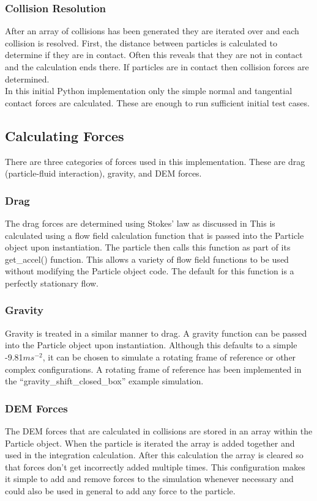\documentclass[10pt,a4paper,titlepage]{report}
\begin{document}
\subsubsection{Collision Resolution}
After an array of collisions has been generated they are iterated over and each collision is resolved. First, the distance between particles is calculated to determine if they are in contact. Often this reveals that they are not in contact and the calculation ends there. If particles are in contact then collision forces are determined.
\\In this initial Python implementation only the simple normal and tangential contact forces are calculated. These are enough to run sufficient initial test cases.
\subsection{Calculating Forces}
There are three categories of forces used in this implementation. These are drag (particle-fluid interaction), gravity, and DEM forces.
\subsubsection{Drag}
The drag forces are determined using Stokes' law as discussed in %
This is calculated using a flow field calculation function that is passed into the Particle object upon instantiation. The particle then calls this function as part of its get\_accel() function. This allows a variety of flow field functions to be used without modifying the Particle object code. The default for this function is a perfectly stationary flow.
\subsubsection{Gravity}
Gravity is treated in a similar manner to drag. A gravity function can be passed into the Particle object upon instantiation. Although this defaults to a simple -9.81$ms^{-2}$, it can be chosen to simulate a rotating frame of reference or other complex configurations. A rotating frame of reference has been implemented in the ``gravity\_shift\_closed\_box'' example simulation. %
\subsubsection{DEM Forces}
The DEM forces that are calculated in collisions are stored in an array within the Particle object. When the particle is iterated the array is added together and used in the integration calculation. After this calculation the array is cleared so that forces don't get incorrectly added multiple times. This configuration makes it simple to add and remove forces to the simulation whenever necessary and could also be used in general to add any force to the particle.
\end{document}
